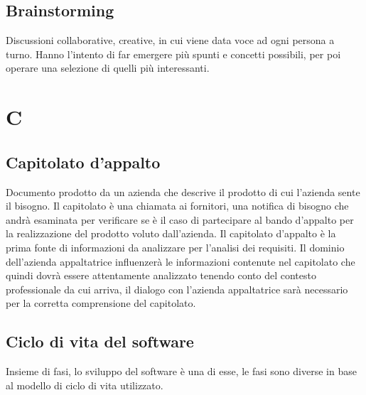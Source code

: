 	\subsection{Brainstorming}
	\label{sec:brainstorming}
	Discussioni collaborative, creative, in cui viene data voce ad ogni persona a turno. Hanno l'intento di far emergere più spunti e concetti possibili, per poi operare una selezione di quelli più interessanti. \newpage
	


	
	\section{C}

	\subsection{Capitolato d'appalto}
	\label{sec:capitolato}
	Documento prodotto da un azienda che descrive il prodotto di cui l'azienda sente il bisogno. Il capitolato è una chiamata ai fornitori, una notifica di bisogno che andrà esaminata per verificare se è il caso di partecipare al bando d'appalto per la realizzazione del prodotto voluto dall'azienda. Il capitolato d'appalto è la prima fonte di informazioni da analizzare per l'analisi dei requisiti. Il dominio dell'azienda appaltatrice influenzerà le informazioni contenute nel capitolato che quindi dovrà essere attentamente analizzato tenendo conto del contesto professionale da cui arriva, il dialogo con l'azienda appaltatrice sarà necessario per la corretta comprensione del capitolato. 
	
	\subsection{Ciclo di vita del software}
	\label{sec:ciclodivita}
	Insieme di fasi, lo sviluppo del software è una di esse, le fasi sono diverse in base al modello di ciclo di vita utilizzato.

